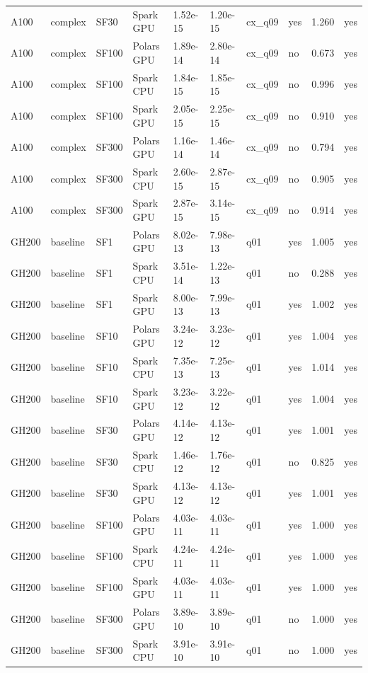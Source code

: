 \begin{longtable}{llllllllrl}
A100 & complex & SF30 & Spark GPU & 1.52e-15 & 1.20e-15 & cx\_q09 & yes & 1.260 & yes \\
A100 & complex & SF100 & Polars GPU & 1.89e-14 & 2.80e-14 & cx\_q09 & no & 0.673 & yes \\
A100 & complex & SF100 & Spark CPU & 1.84e-15 & 1.85e-15 & cx\_q09 & no & 0.996 & yes \\
A100 & complex & SF100 & Spark GPU & 2.05e-15 & 2.25e-15 & cx\_q09 & no & 0.910 & yes \\
A100 & complex & SF300 & Polars GPU & 1.16e-14 & 1.46e-14 & cx\_q09 & no & 0.794 & yes \\
A100 & complex & SF300 & Spark CPU & 2.60e-15 & 2.87e-15 & cx\_q09 & no & 0.905 & yes \\
A100 & complex & SF300 & Spark GPU & 2.87e-15 & 3.14e-15 & cx\_q09 & no & 0.914 & yes \\
GH200 & baseline & SF1 & Polars GPU & 8.02e-13 & 7.98e-13 & q01 & yes & 1.005 & yes \\
GH200 & baseline & SF1 & Spark CPU & 3.51e-14 & 1.22e-13 & q01 & no & 0.288 & yes \\
GH200 & baseline & SF1 & Spark GPU & 8.00e-13 & 7.99e-13 & q01 & yes & 1.002 & yes \\
GH200 & baseline & SF10 & Polars GPU & 3.24e-12 & 3.23e-12 & q01 & yes & 1.004 & yes \\
GH200 & baseline & SF10 & Spark CPU & 7.35e-13 & 7.25e-13 & q01 & yes & 1.014 & yes \\
GH200 & baseline & SF10 & Spark GPU & 3.23e-12 & 3.22e-12 & q01 & yes & 1.004 & yes \\
GH200 & baseline & SF30 & Polars GPU & 4.14e-12 & 4.13e-12 & q01 & yes & 1.001 & yes \\
GH200 & baseline & SF30 & Spark CPU & 1.46e-12 & 1.76e-12 & q01 & no & 0.825 & yes \\
GH200 & baseline & SF30 & Spark GPU & 4.13e-12 & 4.13e-12 & q01 & yes & 1.001 & yes \\
GH200 & baseline & SF100 & Polars GPU & 4.03e-11 & 4.03e-11 & q01 & yes & 1.000 & yes \\
GH200 & baseline & SF100 & Spark CPU & 4.24e-11 & 4.24e-11 & q01 & yes & 1.000 & yes \\
GH200 & baseline & SF100 & Spark GPU & 4.03e-11 & 4.03e-11 & q01 & yes & 1.000 & yes \\
GH200 & baseline & SF300 & Polars GPU & 3.89e-10 & 3.89e-10 & q01 & no & 1.000 & yes \\
GH200 & baseline & SF300 & Spark CPU & 3.91e-10 & 3.91e-10 & q01 & no & 1.000 & yes \\

\end{longtable}
